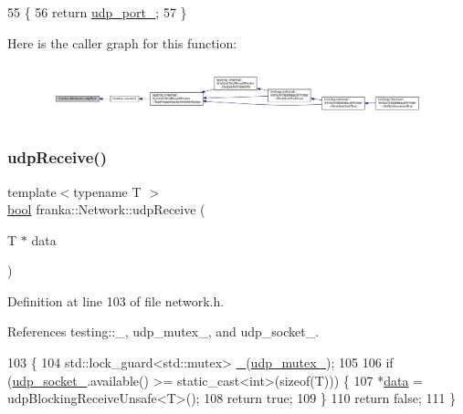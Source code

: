 \begin{DoxyCode}
55                                          \{
56   \textcolor{keywordflow}{return} \hyperlink{classfranka_1_1Network_a8bbe2dd022044033dbb2818db1a0e76b}{udp\_port\_};
57 \}
\end{DoxyCode}
Here is the caller graph for this function\+:
\nopagebreak
\begin{figure}[H]
\begin{center}
\leavevmode
\includegraphics[width=350pt]{classfranka_1_1Network_ac3d85a9e79ef349dda41a6dfb0f0d49e_icgraph}
\end{center}
\end{figure}
\mbox{\label{classfranka_1_1Network_a904bdd93b768d83d62c93c273cff7b32}} 
\subsubsection{\texorpdfstring{udp\+Receive()}{udpReceive()}}
{\footnotesize\ttfamily template$<$typename T $>$ \\
\hyperlink{classbool}{bool} franka\+::\+Network\+::udp\+Receive (\begin{DoxyParamCaption}\item[{T $\ast$}]{data }\end{DoxyParamCaption})}



Definition at line 103 of file network.\+h.



References testing\+::\+\_\+, udp\+\_\+mutex\+\_\+, and udp\+\_\+socket\+\_\+.


\begin{DoxyCode}
103                                 \{
104   std::lock\_guard<std::mutex> \hyperlink{namespacetesting_a4ba77a3f5b67166ff1b59d96a32346a2}{\_}(\hyperlink{classfranka_1_1Network_ab22bfa46c27a565336d6231971b019be}{udp\_mutex\_});
105 
106   \textcolor{keywordflow}{if} (\hyperlink{classfranka_1_1Network_ac09fea0946977e7c366ad4a3421ef621}{udp\_socket\_}.available() >= \textcolor{keyword}{static\_cast<}\textcolor{keywordtype}{int}\textcolor{keyword}{>}(\textcolor{keyword}{sizeof}(T))) \{
107     *\hyperlink{namespacekeyboard__server__node_abfec01745fb17e2aa813913bea03d707}{data} = udpBlockingReceiveUnsafe<T>();
108     \textcolor{keywordflow}{return} \textcolor{keyword}{true};
109   \}
110   \textcolor{keywordflow}{return} \textcolor{keyword}{false};
111 \}
\end{DoxyCode}
\mbox{\label{classfranka_1_1Network_ac5a58083323e337012313b4a3580c2cc}} 
